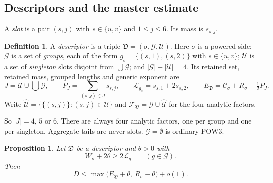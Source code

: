 \documentclass{amsart}
\newtheorem{proposition}[lemma]{Proposition}
\theoremstyle{definition}
\newtheorem{definition}[lemma]{Definition}
\theoremstyle{plain}
\numberwithin{equation}{section}
\numberwithin{table}{section}
\begin{document}
\subsection{Descriptors and the master estimate}\label{sec:pow3:master}

A \emph{slot} is a pair $(s,j)$ with $s\in\{u,v\}$ and $1\le j\le6$. Its mass is
$s_{s,j}$.

\begin{definition}\label{def:pw:desc}
 A \emph{descriptor} is a triple $\mathfrak D=(\sigma,\mathcal G,\mathcal U)$.
Here $\sigma$ is a powered side; $\mathcal G$ is a set of \emph{groups}, each
of the form $g_s=\{(s,1),(s,2)\}$ with $s\in\{u,v\}$; $\mathcal U$ is a set of
\emph{singleton} slots disjoint from $\bigcup\mathcal G$; and
$|\mathcal G|+|\mathcal U|=4$. Its retained set, retained mass, grouped
lengths and generic exponent are
\begin{equation}\label{eq:pw:PSL}
 J=\mathcal U\cup\bigcup\mathcal G,\qquad
 P_J=\sum_{(s,j)\in J}s_{s,j},\qquad
 \mathcal L_{g_s}=s_{s,1}+2s_{s,2},\qquad
 E_{\mathfrak D}=\mathcal C_\sigma+R_\sigma-\tfrac12P_J .
\end{equation}
Write $\widehat{\mathcal U}=\{\{(s,j)\}:(s,j)\in\mathcal U\}$ and
$\mathcal F_{\mathfrak D}=\mathcal G\cup\widehat{\mathcal U}$ for the four
analytic factors.
\end{definition}

So $|J|=4$, $5$ or $6$. There are always four analytic factors, one per
group and one per singleton. Aggregate tails are never
slots. $\mathcal G=\emptyset$ is ordinary $\mathrm{POW3}$.

\begin{proposition}\label{prop:pw:master}
Let $\mathfrak D$ be a descriptor and $\theta>0$ with
\begin{equation}\label{eq:pw:guard}
 W_\sigma+2\theta\ge2\mathcal L_g\qquad(g\in\mathcal G).
\end{equation}
Then
\begin{equation}\label{eq:pw:master}
 D\le\max\bigl(E_{\mathfrak D}+\theta,\ R_\sigma-\theta\bigr)+o(1).
\end{equation}
\end{proposition}
\end{document}
